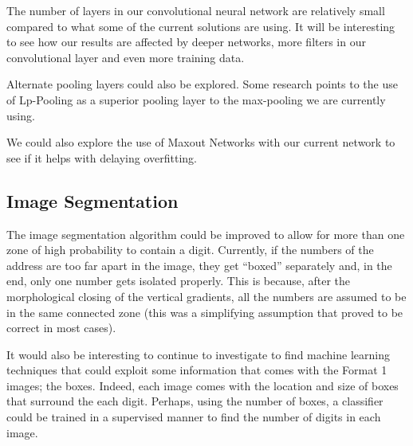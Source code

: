 \documentclass{article} %
\begin{document}
The number of layers in our convolutional neural network are relatively small compared to what some of the current solutions are using. It will be interesting to see how our results are affected by deeper networks, more filters in our convolutional layer and even more training data. 

Alternate pooling layers could also be explored. Some research points to the use of Lp-Pooling\cite{lecun_convolutional_svhn} as a superior pooling layer to the max-pooling we are currently using.

We could also explore the use of Maxout Networks\cite{maxout} with our current network to see if it helps with delaying overfitting.

\subsection{Image Segmentation}
The image segmentation algorithm could be improved to allow for more than one zone of high probability to contain a digit. Currently, if the numbers of the address are too far apart in the image, they get “boxed” separately and, in the end, only one number gets isolated properly. This is because, after the morphological closing of the vertical gradients, all the numbers are assumed to be in the same connected zone (this was a simplifying assumption that proved to be correct in most cases).

It would also be interesting to continue to investigate to find machine learning techniques that could exploit some information that comes with the Format 1 images; the boxes. Indeed, each image comes with the location and size of boxes that surround the each digit. Perhaps, using the number of boxes, a classifier could be trained in a supervised manner to find the number of digits in each image. 



\end{document}
